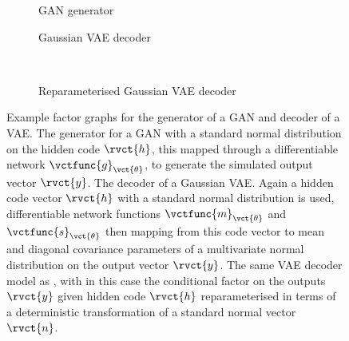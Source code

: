 \begin{figure}[!t]
\centering
\begin{subfigure}[t]{.35\linewidth}
\centering
{}
\caption{\acs{GAN} generator}\label{sfig:gan-generator}
\end{subfigure}%
\begin{subfigure}[t]{.55\linewidth}
\centering
{}
\caption{Gaussian \acs{VAE} decoder}\label{sfig:vae-decoder-marginalised}
\end{subfigure}%
\\[3mm]
\begin{subfigure}[t]{.8\linewidth}
\centering
{}
\caption{Reparameterised Gaussian \acs{VAE} decoder}\label{sfig:vae-decoder}
\end{subfigure}%
\caption[Differentiable generator network factor graphs.]{Example factor graphs for the generator of a \ac{GAN} and decoder of a \ac{VAE}.  The generator for a \ac{GAN} with a standard normal distribution on the hidden code $\rvct{h}$, this mapped through a differentiable network $\vctfunc{g}_{\vct{\theta}}$, to generate the simulated output vector $\rvct{y}$.  The decoder of a Gaussian \ac{VAE}. Again a hidden code vector $\rvct{h}$ with a standard normal distribution is used, differentiable network functions $\vctfunc{m}_{\vct{\theta}}$ and $\vctfunc{s}_{\vct{\theta}}$ then mapping from this code vector to mean and diagonal covariance parameters of a multivariate normal distribution on the output vector $\rvct{y}$.  The same \ac{VAE} decoder model as , with in this case the conditional factor on the outputs $\rvct{y}$ given hidden code $\rvct{h}$ reparameterised in terms of a deterministic transformation of a standard normal vector $\rvct{n}$.}
\label{fig:gan-and-vae-factor-graphs}
\end{figure}

